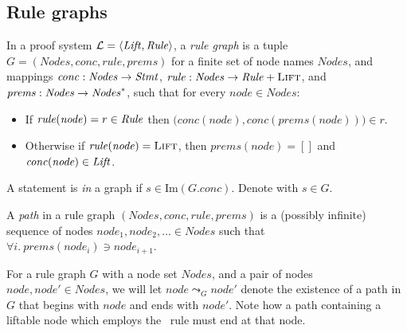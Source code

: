 \newcommand*{\DomNode}{\mathit{Nodes}}
\newcommand*{\node}{\mathit{node}}
\newcommand*{\MapConc}{\mathit{conc}}
\newcommand*{\MapRule}{\mathit{rule}}
\newcommand*{\MapPrems}{\mathit{prems}}

\subsection{Rule graphs}

\begin{definition}
In a proof system
$\mathcal{L} = \left\langle \mathit{Lift}, \mathit{Rule}\right\rangle$,
a \emph{rule graph} 
is a tuple $G=(\DomNode,\MapConc,\MapRule,\MapPrems)$ for a
finite set of node names $\DomNode$,
and mappings %
    $\MapConc : \DomNode \ra \DomStmt$,
    $\MapRule : \DomNode \ra \DomRule + \LIFT$,
 and   $\MapPrems : \DomNode \ra \DomNode^*$,
such that for every $\node \in \DomNode$:
\begin{itemize}
\item If $\MapRule(\node) = r \in \DomRule$
    then
    \(
        \big(\MapConc(\node), \MapConc(\MapPrems(\node))\big) 
        \in r
    \).
\item Otherwise if $\MapRule(\node) = \LIFT$,
    then $\MapPrems(\node) = []$ and 
    $\MapConc(\node) \in \DomLiftable$.
\end{itemize}
\end{definition}

A statement is \emph{in} a graph if $s \in \mathrm{Im}(G.\MapConc)$.
Denote with $s \in G$.

\begin{definition}
    A \emph{path} in a rule graph $(\DomNode,\MapConc,\MapRule,\MapPrems)$
    is a (possibly infinite) sequence of nodes
    $\node_1,\node_2,\dots \in \DomNode$
    such that
    $\forall i.\
    \MapPrems(\node_i) \ni \node_{i+1}$.
\end{definition}

\newcommand*{\reaches}[3]{%
    \ensuremath{#1 \leadsto_{#3} #2}%
}
For a rule graph $G$ with a node set $\DomNode$,
and a pair of nodes $\node, \node' \in \DomNode$,
we will let \reaches{\node}{\node'}{G} denote
the existence of a path in $G$
that begins with $\node$ and ends with $\node'$.
Note how a path containing a liftable node 
which employs the \LIFT\ rule must end at that node.

